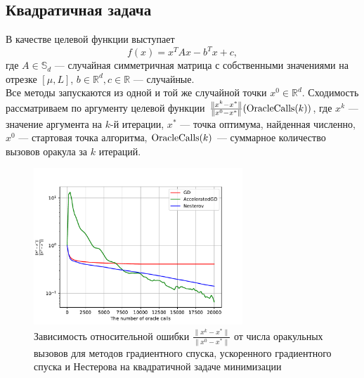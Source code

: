 \documentclass{article}
\newcommand{\R}{\mathbb{R}}
\begin{document}
\subsection{Квадратичная задача}
В качестве целевой функции выступает
\begin{equation}
 f(x) = x^T A x - b^T x + c,
\end{equation}
где $A \in \mathbb{S}_d$ --- случайная симметричная матрица с собственными значениями на отрезке $[\mu, L]$, $b \in \R^d, c \in \R$ --- случайные.\\
Все методы запускаются из одной и той же случайной точки $x^0 \in \R^d$.
Сходимость рассматриваем по аргументу целевой функции $\frac{\|x^k - x^*\|}{\|x^0 - x^*\|}(\textnormal{OracleCalls}(k))$, где $x^k$ --- значение аргумента на $k$-й итерации, $x^*$ --- точка оптимума, найденная численно, $x^0$ --- стартовая точка алгоритма, $\textnormal{OracleCalls}(k)$ --- суммарное количество вызовов оракула за $k$ итераций.
\begin{figure}[!htbp]
\centering
  \includegraphics[width=0.7\textwidth]{../figures/Deterministic_quadratic_GD_AGD_Nesterov_15.pdf}
 \caption{Зависимость относительной ошибки $\frac{\|x^k - x^*\|}{\|x^0 - x^*\|}$ от числа оракульных вызовов для методов градиентного спуска, ускоренного градиентного спуска и Нестерова на квадратичной задаче минимизации}
  \label{fig:non-stochastic_logreg}
\end{figure}
\end{document}
